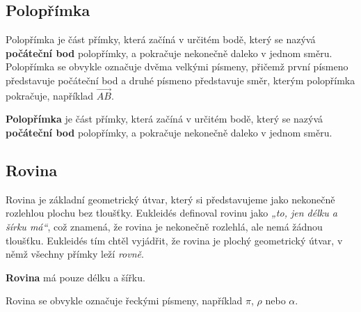 \documentclass[12pt,a4paper]{article}
\begin{document}
\subsection{Polopřímka}
Polopřímka je část přímky, která začíná v určitém bodě, který se nazývá \textbf{počáteční bod} polopřímky, a pokračuje nekonečně daleko v jednom směru.
Polopřímka se obvykle označuje dvěma velkými písmeny, přičemž první písmeno představuje počáteční bod a druhé písmeno představuje směr, 
kterým polopřímka pokračuje, například $\overrightarrow{AB}$.

\begin{definitionbox}
    \textbf{Polopřímka} je část přímky, která začíná v určitém bodě, který se nazývá \textbf{počáteční bod} polopřímky, a pokračuje nekonečně daleko v jednom směru.
\end{definitionbox}

\begin{center}
\end{center}

\subsection{Rovina}
Rovina je základní geometrický útvar, který si představujeme jako nekonečně rozlehlou plochu bez tloušťky. 
Eukleidés definoval rovinu jako \emph{„to, jen délku a šírku má“}, což znamená, že rovina je nekonečně rozlehlá, ale nemá žádnou tloušťku.
Eukleidés tím chtěl vyjádřit, že rovina je plochý geometrický útvar, v němž všechny přímky leží \emph{rovně}.

\begin{definitionbox}
    \textbf{Rovina} má pouze délku a šířku.
\end{definitionbox}

Rovina se obvykle označuje řeckými písmeny, například \(\pi\), \(\rho\) nebo \(\alpha\).

\begin{center}
\end{center}
\end{document}
